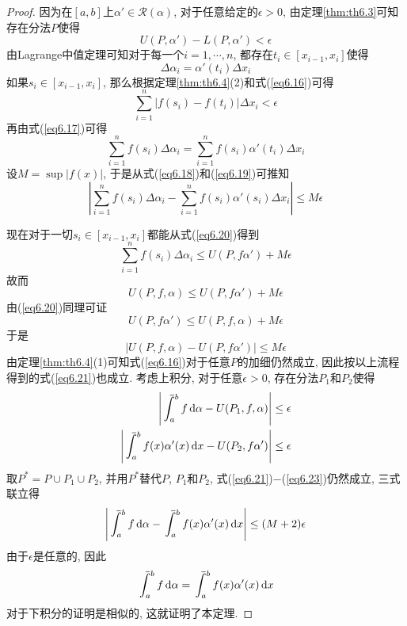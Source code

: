 \documentclass[cn,12pt,math=mtpro2,citestyle=gb7714-2015,bibstyle=gb7714-2015,twocol]{elegantbook}
\newcommand{\dx}{\,\text{d}x}
\newcommand{\da}{\,\text{d}\alpha}
\def\upint{\mathchoice%
    {\mkern13mu\overline{\vphantom{\intop}\mkern7mu}\mkern-20mu}%
    {\mkern7mu\overline{\vphantom{\intop}\mkern7mu}\mkern-14mu}%
    {\mkern7mu\overline{\vphantom{\intop}\mkern7mu}\mkern-14mu}%
    {\mkern7mu\overline{\vphantom{\intop}\mkern7mu}\mkern-14mu}%
  \int}
\begin{document}
\begin{proof}
因为在$[a,b]$上$\alpha'\in\mathscr{R}(\alpha)$, 对于任意给定的$\epsilon>0$, 由定理\ref{thm:th6.3}可知存在分法$P$使得
\begin{equation}\label{eq6.16}
U(P,\alpha')-L(P,\alpha')<\epsilon
\end{equation}
由Lagrange中值定理可知对于每一个$i=1,\cdots,n$, 都存在$t_i\in[x_{i-1},x_i]$使得
\begin{equation}\label{eq6.17}
  \Delta\alpha_i=\alpha'(t_i)\Delta x_i
\end{equation}
如果$s_i\in[x_{i-1},x_i]$, 那么根据定理\ref{thm:th6.4}(2)和式(\ref{eq6.16})可得
\begin{equation}\label{eq6.18}
  \sum_{i=1}^{n}|f(s_i)-f(t_i)|\Delta x_i<\epsilon
\end{equation}
再由式(\ref{eq6.17})可得
\begin{equation}\label{eq6.19}
  \sum_{i=1}^{n}f(s_i)\Delta \alpha_i=\sum_{i=1}^{n}f(s_i)\alpha'(t_i)\Delta x_i
\end{equation}
设$M=\sup |f(x)|$, 于是从式(\ref{eq6.18})和(\ref{eq6.19})可推知
\begin{equation}\label{eq6.20}
  \left|\sum_{i=1}^{n}f(s_i)\Delta\alpha_i-\sum_{i=1}^{n}f(s_i)\alpha'(s_i)\Delta x_i\right|\leq M\epsilon
\end{equation}

现在对于一切$s_i\in[x_{i-1},x_i]$都能从式(\ref{eq6.20})得到
$$\sum_{i=1}^{n}f(s_i)\Delta\alpha_i\leq U(P,f\alpha')+M\epsilon$$
故而
$$U(P,f,\alpha)\leq U(P,f\alpha')+M\epsilon$$
由(\ref{eq6.20})同理可证
$$U(P,f\alpha')\leq U(P,f,\alpha)+M\epsilon$$
于是
\begin{equation}\label{eq6.21}
  |U(P,f,\alpha)- U(P,f\alpha')|\leq M\epsilon
\end{equation}
由定理\ref{thm:th6.4}(1)可知式(\ref{eq6.16})对于任意$P$的加细仍然成立, 因此按以上流程得到的式(\ref{eq6.21})也成立. 考虑上积分, 对于任意$\epsilon>0$, 存在分法$P_1$和$P_2$使得
\begin{align}
\left|\upint_a^bf\da-U(P_1,f,\alpha)\right|&\leq\epsilon \label{eq6.22} \\
\left|\upint_a^bf(x)\alpha'(x)\dx-U(P_2,f\alpha')\right|&\leq\epsilon  \label{eq6.23}
\end{align}
取$P^\ast=P\cup P_1\cup P_2$, 并用$P^\ast$替代$P$, $P_1$和$P_2$, 式(\ref{eq6.21})$-$(\ref{eq6.23})仍然成立, 三式联立得
$$\left|\upint_a^bf\da-\upint_a^bf(x)\alpha'(x)\dx\right|\leq (M+2)\epsilon$$
由于$\epsilon$是任意的, 因此
$$\displaystyle\upint_a^bf\da=\upint_a^bf(x)\alpha'(x)\dx$$
对于下积分的证明是相似的, 这就证明了本定理.
\end{proof}
\end{document}
